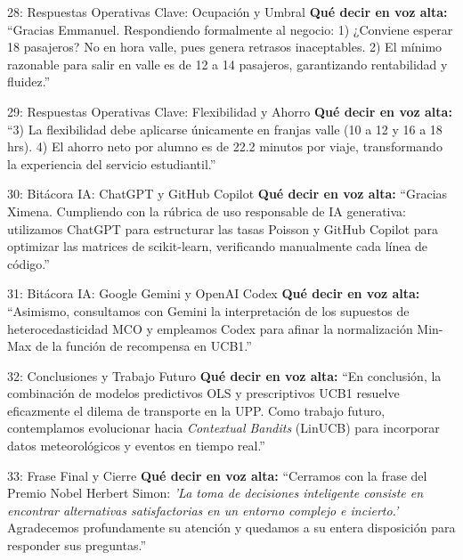 \documentclass[11pt, a4paper]{article}
\begin{document}
\begin{ximenabox}{28: Respuestas Operativas Clave: Ocupación y Umbral}
\textbf{Qué decir en voz alta:}
``Gracias Emmanuel. Respondiendo formalmente al negocio: 1) ¿Conviene esperar 18 pasajeros? No en hora valle, pues genera retrasos inaceptables. 2) El mínimo razonable para salir en valle es de 12 a 14 pasajeros, garantizando rentabilidad y fluidez.''
\end{ximenabox}

\begin{ximenabox}{29: Respuestas Operativas Clave: Flexibilidad y Ahorro}
\textbf{Qué decir en voz alta:}
``3) La flexibilidad debe aplicarse únicamente en franjas valle (10 a 12 y 16 a 18 hrs). 4) El ahorro neto por alumno es de 22.2 minutos por viaje, transformando la experiencia del servicio estudiantil.''
\end{ximenabox}

\begin{emmanuelbox}{30: Bitácora IA: ChatGPT y GitHub Copilot}
\textbf{Qué decir en voz alta:}
``Gracias Ximena. Cumpliendo con la rúbrica de uso responsable de IA generativa: utilizamos ChatGPT para estructurar las tasas Poisson y GitHub Copilot para optimizar las matrices de scikit-learn, verificando manualmente cada línea de código.''
\end{emmanuelbox}

\begin{emmanuelbox}{31: Bitácora IA: Google Gemini y OpenAI Codex}
\textbf{Qué decir en voz alta:}
``Asimismo, consultamos con Gemini la interpretación de los supuestos de heterocedasticidad MCO y empleamos Codex para afinar la normalización Min-Max de la función de recompensa en UCB1.''
\end{emmanuelbox}

\begin{ximenabox}{32: Conclusiones y Trabajo Futuro}
\textbf{Qué decir en voz alta:}
``En conclusión, la combinación de modelos predictivos OLS y prescriptivos UCB1 resuelve eficazmente el dilema de transporte en la UPP. Como trabajo futuro, contemplamos evolucionar hacia \textit{Contextual Bandits} (LinUCB) para incorporar datos meteorológicos y eventos en tiempo real.''
\end{ximenabox}

\begin{emmanuelbox}{33: Frase Final y Cierre}
\textbf{Qué decir en voz alta:}
``Cerramos con la frase del Premio Nobel Herbert Simon: \textit{'La toma de decisiones inteligente consiste en encontrar alternativas satisfactorias en un entorno complejo e incierto.'} Agradecemos profundamente su atención y quedamos a su entera disposición para responder sus preguntas.''
\end{emmanuelbox}
\end{document}
